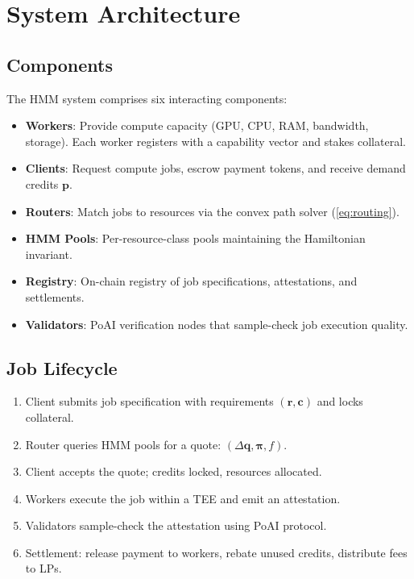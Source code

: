 \documentclass[11pt,twocolumn]{article}
\begin{document}
\section{System Architecture}
\label{sec:architecture}

\subsection{Components}

The HMM system comprises six interacting components:

\begin{itemize}[leftmargin=1.1em]
    \item \textbf{Workers}: Provide compute capacity (GPU, CPU, RAM, bandwidth, storage). Each worker registers with a capability vector and stakes collateral.
    \item \textbf{Clients}: Request compute jobs, escrow payment tokens, and receive demand credits $\bm{p}$.
    \item \textbf{Routers}: Match jobs to resources via the convex path solver (\ref{eq:routing}).
    \item \textbf{HMM Pools}: Per-resource-class pools maintaining the Hamiltonian invariant.
    \item \textbf{Registry}: On-chain registry of job specifications, attestations, and settlements.
    \item \textbf{Validators}: PoAI verification nodes that sample-check job execution quality.
\end{itemize}

\subsection{Job Lifecycle}

\begin{enumerate}[leftmargin=1.4em]
    \item Client submits job specification with requirements $(\bm{r}, \bm{c})$ and locks collateral.
    \item Router queries HMM pools for a quote: $(\Delta\bm{q}, \bm{\pi}, f)$.
    \item Client accepts the quote; credits locked, resources allocated.
    \item Workers execute the job within a TEE and emit an attestation.
    \item Validators sample-check the attestation using PoAI protocol.
    \item Settlement: release payment to workers, rebate unused credits, distribute fees to LPs.
\end{enumerate}
\end{document}
